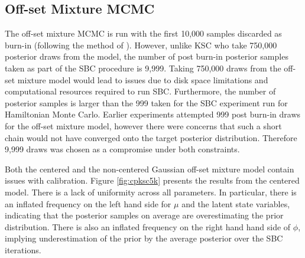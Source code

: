 \documentclass[12pt, a4paper]{article}
\begin{document}
    
    \subsection{Off-set Mixture MCMC}
    The off-set mixture MCMC is run with the first 10,000 samples discarded as burn-in (following the method of \citet{kim1998stochastic}). However, unlike KSC who take 750,000 posterior draws from the model, the number of post burn-in posterior samples taken as part of the SBC procedure is 9,999. Taking 750,000 draws from the off-set mixture model would lead to issues due to disk space limitations and computational resources required to run SBC. Furthermore, the number of posterior samples is larger than the 999 taken for the SBC experiment run for Hamiltonian Monte Carlo. Earlier experiments attempted 999 post burn-in draws for the off-set mixture model, however there were concerns that such a short chain would not have converged onto the target posterior distribution. Therefore 9,999 draws was chosen as a compromise under both constraints. 

    Both the centered and the non-centered Gaussian off-set mixture model contain issues with calibration. Figure \ref{fig:cpksc5k} presents the results from the centered model. There is a lack of uniformity across all parameters. In particular, there is an inflated frequency on the left hand side for $\mu$ and the latent state variables, indicating that the posterior samples on average are overestimating the prior distribution. There is also an inflated frequency on the right hand hand side of $\phi$, implying underestimation of the prior by the average posterior over the SBC iterations. 
\end{document}
